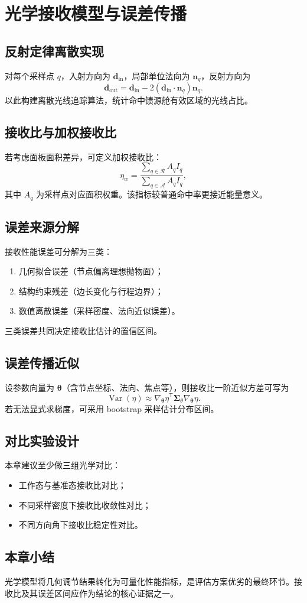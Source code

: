 \chapter{光学接收模型与误差传播}

\section{反射定律离散实现}
对每个采样点 $q$，入射方向为 $\mathbf d_{\text{in}}$，局部单位法向为 $\mathbf n_q$，反射方向为
\[
\mathbf d_{\text{out}}=\mathbf d_{\text{in}}-2(\mathbf d_{\text{in}}\cdot\mathbf n_q)\mathbf n_q.
\]
以此构建离散光线追踪算法，统计命中馈源舱有效区域的光线占比。

\section{接收比与加权接收比}
若考虑面板面积差异，可定义加权接收比：
\[
\eta_w=\frac{\sum_{q\in\mathcal R}A_q I_q}{\sum_{q\in\mathcal A}A_q I_q},
\]
其中 $A_q$ 为采样点对应面积权重。该指标较普通命中率更接近能量意义。

\section{误差来源分解}
接收性能误差可分解为三类：
\begin{enumerate}
  \item 几何拟合误差（节点偏离理想抛物面）；
  \item 结构约束残差（边长变化与行程边界）；
  \item 数值离散误差（采样密度、法向近似误差）。
\end{enumerate}
三类误差共同决定接收比估计的置信区间。

\section{误差传播近似}
设参数向量为 $\bm\theta$（含节点坐标、法向、焦点等），则接收比一阶近似方差可写为
\[
\operatorname{Var}(\eta)\approx \nabla_{\bm\theta}\eta^\mathsf T\mathbf\Sigma_\theta\nabla_{\bm\theta}\eta.
\]
若无法显式求梯度，可采用 bootstrap 采样估计分布区间。

\section{对比实验设计}
本章建议至少做三组光学对比：
\begin{itemize}
  \item 工作态与基准态接收比对比；
  \item 不同采样密度下接收比收敛性对比；
  \item 不同方向角下接收比稳定性对比。
\end{itemize}

\section{本章小结}
光学模型将几何调节结果转化为可量化性能指标，是评估方案优劣的最终环节。接收比及其误差区间应作为结论的核心证据之一。
